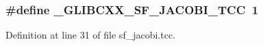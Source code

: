 \subsubsection[{\texorpdfstring{\+\_\+\+G\+L\+I\+B\+C\+X\+X\+\_\+\+S\+F\+\_\+\+J\+A\+C\+O\+B\+I\+\_\+\+T\+CC}{_GLIBCXX_SF_JACOBI_TCC}}]{\setlength{\rightskip}{0pt plus 5cm}\#define \+\_\+\+G\+L\+I\+B\+C\+X\+X\+\_\+\+S\+F\+\_\+\+J\+A\+C\+O\+B\+I\+\_\+\+T\+CC~1}\hypertarget{sf__jacobi_8tcc_a5aaa350a13d7d5da211f2b2bbdd648bb}{}\label{sf__jacobi_8tcc_a5aaa350a13d7d5da211f2b2bbdd648bb}


Definition at line 31 of file sf\+\_\+jacobi.\+tcc.

